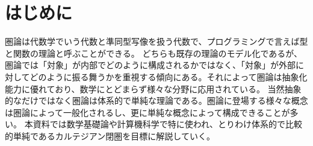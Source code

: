 \section{はじめに}\label{chap-1-introduction}
  圏論は代数学でいう代数と準同型写像を扱う代数で、プログラミングで言えば型と関数の理論と呼ぶことができる。
  どちらも既存の理論のモデル化であるが、圏論では「対象」が内部でどのように構成されるかではなく、「対象」が外部に対してどのように振る舞うかを重視する傾向にある。それによって圏論は抽象化能力に優れており、数学にとどまらず様々な分野に応用されている。
  当然抽象的なだけではなく圏論は体系的で単純な理論である。圏論に登場する様々な概念は圏論によって一般化されるし、更に単純な概念によって構成できることが多い。
	本資料では数学基礎論や計算機科学で特に使われ、とりわけ体系的で比較的単純であるカルテジアン閉圏を目標に解説していく。
